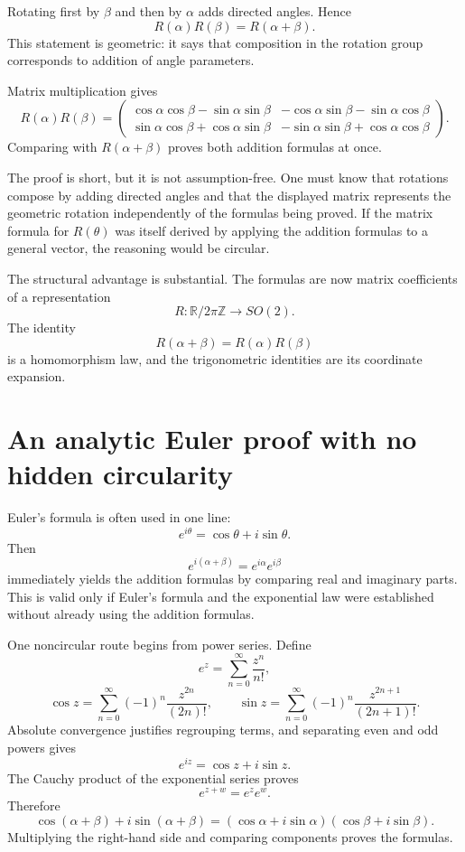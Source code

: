 Rotating first by \(\beta\) and then by \(\alpha\) adds directed angles.  Hence
\[
  R(\alpha)R(\beta)=R(\alpha+\beta).
\]
This statement is geometric: it says that composition in the rotation group corresponds to addition of angle parameters.

Matrix multiplication gives
\[
  R(\alpha)R(\beta)
  =
  \begin{pmatrix}
    \cos\alpha\cos\beta-\sin\alpha\sin\beta
    &-\cos\alpha\sin\beta-\sin\alpha\cos\beta\\
    \sin\alpha\cos\beta+\cos\alpha\sin\beta
    &-\sin\alpha\sin\beta+\cos\alpha\cos\beta
  \end{pmatrix}.
\]
Comparing with \(R(\alpha+\beta)\) proves both addition formulas at once.

The proof is short, but it is not assumption-free.  One must know that rotations compose by adding directed angles and that the displayed matrix represents the geometric rotation independently of the formulas being proved.  If the matrix formula for \(R(\theta)\) was itself derived by applying the addition formulas to a general vector, the reasoning would be circular.

The structural advantage is substantial.  The formulas are now matrix coefficients of a representation
\[
  R:\mathbb R/2\pi\mathbb Z\longrightarrow SO(2).
\]
The identity
\[
  R(\alpha+\beta)=R(\alpha)R(\beta)
\]
is a homomorphism law, and the trigonometric identities are its coordinate expansion.

\section{An analytic Euler proof with no hidden circularity}

Euler's formula is often used in one line:
\[
  e^{i\theta}=\cos\theta+i\sin\theta.
\]
Then
\[
  e^{i(\alpha+\beta)}=e^{i\alpha}e^{i\beta}
\]
immediately yields the addition formulas by comparing real and imaginary parts.  This is valid only if Euler's formula and the exponential law were established without already using the addition formulas.

One noncircular route begins from power series.  Define
\[
  e^z=\sum_{n=0}^{\infty}\frac{z^n}{n!},
\]
\[
  \cos z=\sum_{n=0}^{\infty}(-1)^n\frac{z^{2n}}{(2n)!},
  \qquad
  \sin z=\sum_{n=0}^{\infty}(-1)^n\frac{z^{2n+1}}{(2n+1)!}.
\]
Absolute convergence justifies regrouping terms, and separating even and odd powers gives
\[
  e^{iz}=\cos z+i\sin z.
\]
The Cauchy product of the exponential series proves
\[
  e^{z+w}=e^ze^w.
\]
Therefore
\[
  \cos(\alpha+\beta)+i\sin(\alpha+\beta)
  =
  (\cos\alpha+i\sin\alpha)
  (\cos\beta+i\sin\beta).
\]
Multiplying the right-hand side and comparing components proves the formulas.

